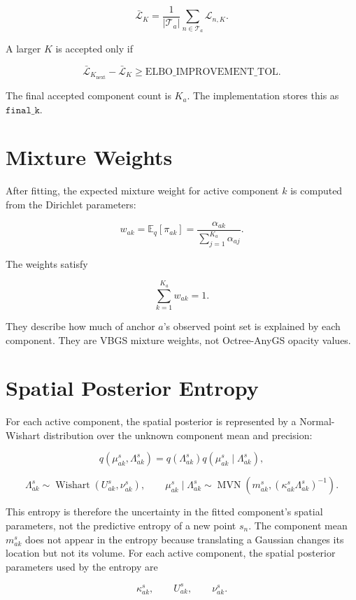 \documentclass[11pt]{article}
\newcommand{\E}{\mathbb{E}}
\newcommand{\MVN}{\operatorname{MVN}}
\begin{document}
\[
  \bar{\mathcal{L}}_K
  =
  \frac{1}{|\mathcal{T}_a|}
  \sum_{n \in \mathcal{T}_a}
  \mathcal{L}_{n,K}.
\]

A larger \(K\) is accepted only if

\[
  \bar{\mathcal{L}}_{K_{\mathrm{next}}}
  -
  \bar{\mathcal{L}}_K
  \geq
  \mathrm{ELBO\_IMPROVEMENT\_TOL}.
\]

The final accepted component count is \(K_a\). The implementation stores this
as \(\texttt{final\_k}\).

\section{Mixture Weights}

After fitting, the expected mixture weight for active component \(k\) is
computed from the Dirichlet parameters:

\[
  w_{ak}
  =
  \E_q[\pi_{ak}]
  =
  \frac{\alpha_{ak}}
       {\sum_{j=1}^{K_a} \alpha_{aj}}.
\]

The weights satisfy

\[
  \sum_{k=1}^{K_a} w_{ak} = 1.
\]

They describe how much of anchor \(a\)'s observed point set is explained by
each component. They are VBGS mixture weights, not Octree-AnyGS opacity values.

\section{Spatial Posterior Entropy}

For each active component, the spatial posterior is represented by a
Normal-Wishart distribution over the unknown component mean and precision:

\[
  q(\mu^s_{ak}, \Lambda^s_{ak})
  =
  q(\Lambda^s_{ak})
  q(\mu^s_{ak} \mid \Lambda^s_{ak}),
\]

\[
  \Lambda^s_{ak}
  \sim
  \operatorname{Wishart}(U^s_{ak}, \nu^s_{ak}),
  \qquad
  \mu^s_{ak} \mid \Lambda^s_{ak}
  \sim
  \MVN
  \left(
    m^s_{ak},
    (\kappa^s_{ak}\Lambda^s_{ak})^{-1}
  \right).
\]

This entropy is therefore the uncertainty in the fitted component's spatial
parameters, not the predictive entropy of a new point \(s_n\). The component
mean \(m^s_{ak}\) does not appear in the entropy because translating a
Gaussian changes its location but not its volume. For each active component,
the spatial posterior parameters used by the entropy are

\[
  \kappa^s_{ak},
  \qquad
  U^s_{ak},
  \qquad
  \nu^s_{ak}.
\]
\end{document}

